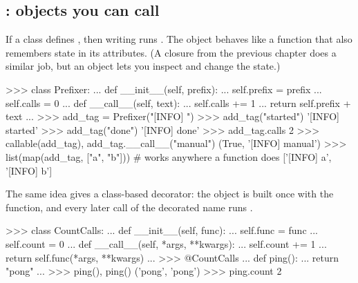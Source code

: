\subsection{: objects you can call}

If a class defines , then writing  runs .
The object behaves like a function that also remembers state in its attributes. (A closure
from the previous chapter does a similar job, but an object lets you inspect and change the state.)

\begin{center}
\end{center}

\begin{pycode}
>>> class Prefixer:
...     def __init__(self, prefix):
...         self.prefix = prefix
...         self.calls = 0
...     def __call__(self, text):
...         self.calls += 1
...         return self.prefix + text
...
>>> add_tag = Prefixer("[INFO] ")
>>> add_tag("started")
'[INFO] started'
>>> add_tag("done")
'[INFO] done'
>>> add_tag.calls
2
>>> callable(add_tag), add_tag.__call__("manual")
(True, '[INFO] manual')
>>> list(map(add_tag, ["a", "b"]))        # works anywhere a function does
['[INFO] a', '[INFO] b']
\end{pycode}

The same idea gives a class-based decorator: the object is built once with the function, and every
later call of the decorated name runs .

\begin{pycode}
>>> class CountCalls:
...     def __init__(self, func):
...         self.func = func
...         self.count = 0
...     def __call__(self, *args, **kwargs):
...         self.count += 1
...         return self.func(*args, **kwargs)
...
>>> @CountCalls
... def ping():
...     return "pong"
...
>>> ping(), ping()
('pong', 'pong')
>>> ping.count
2
\end{pycode}

